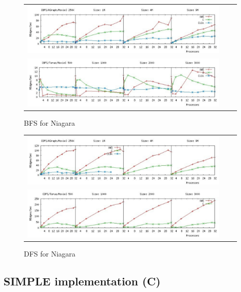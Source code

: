 \begin{figure}
\begin{center}
 \begin{tabular}{ccc}
\includegraphics[width=10cm]{plots/bfs-kgraph-moxie-color.pdf} \\
\includegraphics[width=10cm]{plots/bfs-torus-moxie-color.pdf} \\
 \end{tabular}
\caption{BFS for Niagara}\label{moxie-1}
\end{center}
\end{figure}

\begin{figure}
\begin{center}
 \begin{tabular}{ccc}
\includegraphics[width=10cm]{plots/dfs-kgraph-moxie-color.pdf}\\
\includegraphics[width=10cm]{plots/dfs-torus-moxie-color.pdf}\\

 \end{tabular}
\caption{DFS for Niagara}\label{moxie-2}
\end{center}
\end{figure}

\subsection{SIMPLE implementation (C)}

